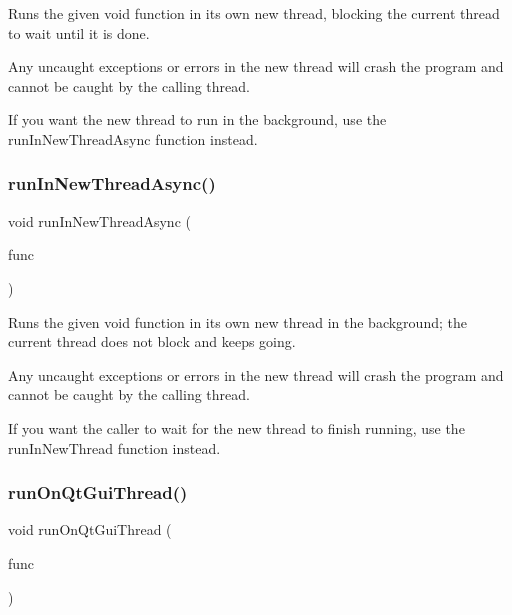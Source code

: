 Runs the given void function in its own new thread, blocking the current thread to wait until it is done. 

Any uncaught exceptions or errors in the new thread will crash the program and cannot be caught by the calling thread.

If you want the new thread to run in the background, use the {\ttfamily run\+In\+New\+Thread\+Async} function instead. \mbox{\label{classGThread_ad40c76521d01473a3eea90c01000d9e2}} 
\subsubsection{\texorpdfstring{run\+In\+New\+Thread\+Async()}{runInNewThreadAsync()}}
{\footnotesize\ttfamily void run\+In\+New\+Thread\+Async (\begin{DoxyParamCaption}\item[{G\+Thunk}]{func }\end{DoxyParamCaption})\hspace{0.3cm}{\ttfamily [static]}}



Runs the given void function in its own new thread in the background; the current thread does not block and keeps going. 

Any uncaught exceptions or errors in the new thread will crash the program and cannot be caught by the calling thread.

If you want the caller to wait for the new thread to finish running, use the {\ttfamily run\+In\+New\+Thread} function instead. \mbox{\label{classGThread_a33da0c87717269710ac7a564a1ebbe64}} 
\subsubsection{\texorpdfstring{run\+On\+Qt\+Gui\+Thread()}{runOnQtGuiThread()}}
{\footnotesize\ttfamily void run\+On\+Qt\+Gui\+Thread (\begin{DoxyParamCaption}\item[{G\+Thunk}]{func }\end{DoxyParamCaption})\hspace{0.3cm}{\ttfamily [static]}}



